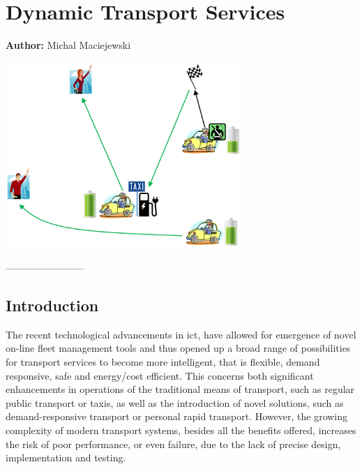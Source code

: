 \chapter{Dynamic Transport Services}
\label{ch:dts}

\hfill \textbf{Author:} Michal Maciejewski

\begin{center} \includegraphics[width=0.67\textwidth, angle=0]{extending/figures/DTS/eTaxiDispMatsimBook.png} \end{center}

{------------------------}
{
\citet{MaciejewskiNagel2013TaxiSimulation, MaciejewskiNagel2013OnlineTaxisVSPWP, MaciejewskiNagel2013CooperationTaxiDispatching, Maciejewski2014OnlineViaOffline}
}

\section{Introduction}
The recent technological advancements in \gls{ict}, have allowed for emergence of novel on-line fleet management tools and thus opened up a broad range of possibilities for transport services to become more intelligent, that is flexible, demand responsive, safe and energy/cost efficient. This concerns both significant enhancements in operations of the traditional means of transport, such as regular public transport or taxis, as well as the introduction of novel solutions, such as demand-responsive transport or personal rapid transport. However, the growing complexity of modern transport systems, besides all the benefits offered, increases the risk of poor performance, or even failure, due to the lack of precise design, implementation and testing.

